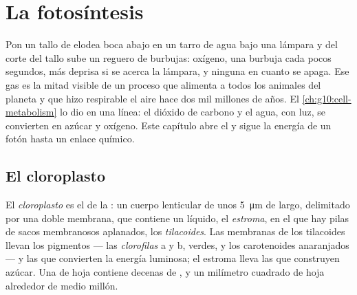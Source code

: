 \chapter{La fotosíntesis}\label{ch:g12:photosynthesis}

Pon un tallo de elodea boca abajo en un tarro de agua bajo una lámpara
y del corte del tallo sube un reguero de burbujas: oxígeno, una burbuja
cada pocos segundos, más deprisa si se acerca la lámpara, y ninguna en
cuanto se apaga. Ese gas es la mitad visible de un proceso que alimenta
a todos los animales del planeta y que hizo respirable el aire hace dos
mil millones de años. El \cref{ch:g10:cell-metabolism} lo dio en una
línea: el dióxido de carbono y el agua, con luz, se convierten en
azúcar y oxígeno. Este capítulo abre el  y sigue la energía
de un fotón hasta un enlace químico.

\section{El cloroplasto}

\begin{definition}[Cloroplasto]\label{def:g12:photosynthesis:chloroplast}
El \emph{cloroplasto} es el  de la
: un cuerpo lenticular de unos \qty{5}{\micro m} de largo,
delimitado por una doble membrana, que contiene un líquido, el
\emph{estroma}, en el que hay pilas de sacos membranosos aplanados, los
\emph{tilacoides}. Las membranas de los tilacoides
llevan los pigmentos --- las \emph{clorofilas} a y b, verdes, y los
carotenoides anaranjados --- y las  que convierten la energía
luminosa; el estroma lleva las  que construyen azúcar. Una
 de hoja contiene decenas de , y un milímetro
cuadrado de hoja alrededor de medio millón.
\end{definition}

